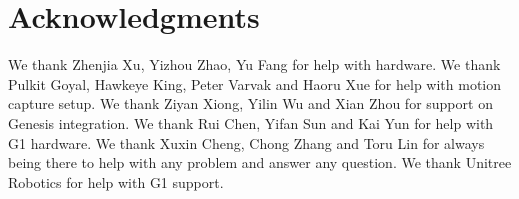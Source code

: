 \section*{Acknowledgments}
We thank Zhenjia Xu, Yizhou Zhao, Yu Fang for help with hardware.
We thank Pulkit Goyal, Hawkeye King, Peter Varvak and Haoru Xue for help with motion capture setup. 
We thank Ziyan Xiong, Yilin Wu and Xian Zhou for support on Genesis integration.
We thank Rui Chen, Yifan Sun and Kai Yun for help with G1 hardware. 
We thank Xuxin Cheng, Chong Zhang and Toru Lin for always being there to help with any problem and answer any question.
We thank Unitree Robotics for help with G1 support. 

